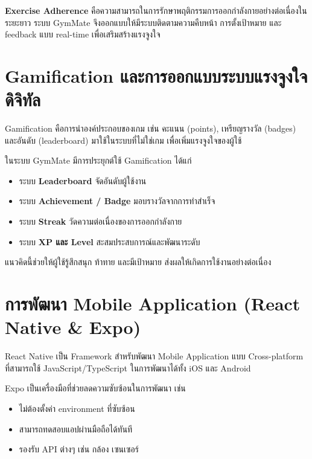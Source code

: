 \noindent
\textbf{Exercise Adherence} คือความสามารถในการรักษาพฤติกรรมการออกกำลังกายอย่างต่อเนื่องในระยะยาว \cite{hhs2018} ระบบ GymMate จึงออกแบบให้มีระบบติดตามความคืบหน้า การตั้งเป้าหมาย และ feedback แบบ real-time เพื่อเสริมสร้างแรงจูงใจ

\section{Gamification และการออกแบบระบบแรงจูงใจดิจิทัล}
\label{sec:gamification}

\noindent
Gamification คือการนำองค์ประกอบของเกม เช่น คะแนน (points), เหรียญรางวัล (badges) และอันดับ (leaderboard) มาใช้ในระบบที่ไม่ใช่เกม เพื่อเพิ่มแรงจูงใจของผู้ใช้ \cite{deterding2011}

ในระบบ GymMate มีการประยุกต์ใช้ Gamification ได้แก่

\begin{itemize}
  \item ระบบ \textbf{Leaderboard} จัดอันดับผู้ใช้งาน
  \item ระบบ \textbf{Achievement / Badge} มอบรางวัลจากการทำสำเร็จ
  \item ระบบ \textbf{Streak} วัดความต่อเนื่องของการออกกำลังกาย
  \item ระบบ \textbf{XP และ Level} สะสมประสบการณ์และพัฒนาระดับ
\end{itemize}

แนวคิดนี้ช่วยให้ผู้ใช้รู้สึกสนุก ท้าทาย และมีเป้าหมาย ส่งผลให้เกิดการใช้งานอย่างต่อเนื่อง

\section{การพัฒนา Mobile Application (React Native \& Expo)}
\label{sec:react-native}

\noindent
React Native เป็น Framework สำหรับพัฒนา Mobile Application แบบ Cross-platform \cite{reactnative} ที่สามารถใช้ JavaScript/TypeScript ในการพัฒนาได้ทั้ง iOS และ Android

Expo \cite{expo} เป็นเครื่องมือที่ช่วยลดความซับซ้อนในการพัฒนา เช่น
\begin{itemize}
  \item ไม่ต้องตั้งค่า environment ที่ซับซ้อน
  \item สามารถทดสอบแอปผ่านมือถือได้ทันที
  \item รองรับ API ต่างๆ เช่น กล้อง เซนเซอร์
\end{itemize}

